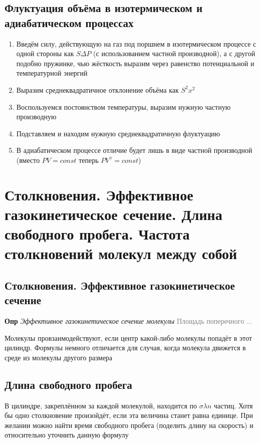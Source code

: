 \documentclass[a4paper, 14pt]{article}
\begin{document}
    \subsection{Флуктуация объёма в изотермическом и адиабатическом процессах}

    \begin{enumerate}
        \item Введём силу, действующую на газ под поршнем в изотермическом процессе с одной стороны как $S \Delta P$
        (с использованием частной производной), а с другой подобно пружинке, чью жёсткость выразим через равенство
        потенциальной и температурной энергий
        \item Выразим среднеквадратичное отклонение объёма как $S^2 x^2$
        \item Воспользуемся постоянством температуры, выразим нужную частную производную
        \item Подставляем и находим нужную среднеквадратичную флуктуацию
        \item В адиабатическом процессе отличие будет лишь в виде частной производной (вместо $PV = const$ теперь $PV^\gamma = const$)
    \end{enumerate}

    \section{Столкновения. Эффективное газокинетическое сечение.
    Длина свободного пробега.
    Частота столкновений молекул между собой}

    \subsection{Столкновения. Эффективное газокинетическое сечение}

    \textbf{Опр} \textit{Эффективное газокинетическое сечение молекулы} \textcolor{gray}{Площадь поперечного ...}

    Молекулы провзаимодействуют, если центр какой-либо молекулы попадёт в этот цилиндр.
    Формулы немного отличается для случая, когда молекула движется в среде из молекулы другого размера

    \subsection{Длина свободного пробега}

    В цилиндре, закреплённом за каждой молекулой, находится по $\sigma \lambda n$ частиц.
    Хотя бы одно столкновение произойдёт, если эта величина станет равна единице.
    При желании можно найти время свободного пробега (поделить длину на скорость) и относительно уточнить данную формулу
\end{document}

